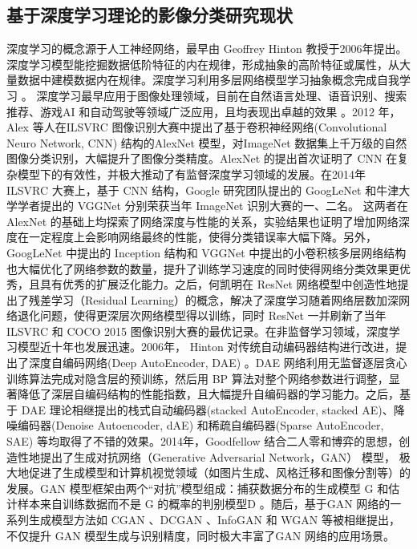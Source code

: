 \subsection{基于深度学习理论的影像分类研究现状}
\label{subsec:1-2-2}
深度学习的概念源于人工神经网络，最早由 Geoffrey Hinton \cite{hinton2006fast} 教授于2006年提出。深度学习模型能挖掘数据低阶特征的内在规律，形成抽象的高阶特征或属性，从大量数据中建模数据内在规律。深度学习利用多层网络模型学习抽象概念完成自我学习 \cite{lecun2015deep}。 深度学习最早应用于图像处理领域，目前在自然语言处理、语音识别、搜索推荐、游戏AI 和自动驾驶等领域广泛应用，且均表现出卓越的效果 \cite{bengio2009learning}。2012 年，Alex 等人在ILSVRC 图像识别大赛中提出了基于卷积神经网络(Convolutional Neuro Network, CNN) 结构的AlexNet \cite{NIPS2012_4824} 模型，对ImageNet 数据集上千万级的自然图像分类识别，大幅提升了图像分类精度。AlexNet 的提出首次证明了 CNN 在复杂模型下的有效性，并极大推动了有监督深度学习领域的发展。在2014年 ILSVRC 大赛上，基于 CNN 结构，Google 研究团队提出的 GoogLeNet \cite{szegedy2015going} 和牛津大学学者提出的 VGGNet \cite{simonyan2014very} 分别荣获当年 ImageNet 识别大赛的一、二名。 这两者在 AlexNet 的基础上均探索了网络深度与性能的关系，实验结果也证明了增加网络深度在一定程度上会影响网络最终的性能，使得分类错误率大幅下降。另外，GoogLeNet 中提出的 Inception 结构和 VGGNet 中提出的小卷积核多层网络结构也大幅优化了网络参数的数量，提升了训练学习速度的同时使得网络分类效果更优秀，且具有优秀的扩展泛化能力。之后，何凯明在 ResNet \cite{he2016deep} 网络模型中创造性地提出了残差学习（Residual Learning）的概念，解决了深度学习随着网络层数加深网络退化问题，使得更深层次网络模型得以训练，同时 ResNet 一并刷新了当年 ILSVRC 和 COCO 2015 图像识别大赛的最优记录。在非监督学习领域，深度学习模型近十年也发展迅速。2006年， Hinton 对传统自动编码器结构进行改进，提出了深度自编码网络(Deep AutoEncoder, DAE) \cite{hinton2006fast}。DAE 网络利用无监督逐层贪心训练算法完成对隐含层的预训练，然后用 BP 算法对整个网络参数进行调整，显著降低了深层自编码结构的性能指数，且大幅提升自编码器的学习能力。之后，基于 DAE 理论相继提出的栈式自动编码器(stacked AutoEncoder, stacked AE)\cite{bengio2007greedy}、降噪编码器(Denoise Autoencoder, dAE)\cite{vincent2008extracting} 和稀疏自编码器(Sparse AutoEncoder, SAE)\cite{ng2011sparse} 等均取得了不错的效果。2014年，Goodfellow 结合二人零和博弈的思想，创造性地提出了生成对抗网络（Generative Adversarial Network，GAN）\cite{goodfellow2014generative} 模型， 极大地促进了生成模型和计算机视觉领域（如图片生成、风格迁移和图像分割等）的发展。GAN 模型框架由两个“对抗”模型组成：捕获数据分布的生成模型 G 和估计样本来自训练数据而不是 G 的概率的判别模型D 。随后，基于GAN 网络的一系列生成模型方法如 CGAN\cite{mirza2014conditional} 、DCGAN \cite{radford2015unsupervised} 、InfoGAN \cite{chen2016infogan} 和 WGAN \cite{arjovsky2017wasserstein} 等被相继提出，不仅提升 GAN 模型生成与识别精度，同时极大丰富了GAN 网络的应用场景。

